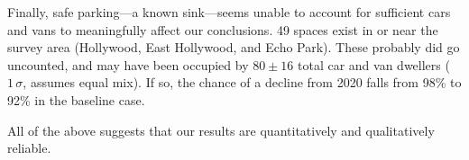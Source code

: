 \documentclass[11pt,twocolumn]{article}
\def\bfr{\bf\color{red}}
\begin{document}
Finally, safe parking---a known sink---seems unable to account for sufficient cars and vans
to meaningfully affect our conclusions. 49 spaces exist in or near the survey area (Hollywood,
East Hollywood, and Echo Park). These probably did go uncounted, and may have been occupied 
by $80\pm16$ total car and van dwellers ($1\,\sigma$, assumes equal mix). If so, the chance of a 
decline from 2020 falls from 98\% to 92\% in the baseline case. 

All of the above suggests that our results are quantitatively and qualitatively reliable.

%
%
%


\end{document}
